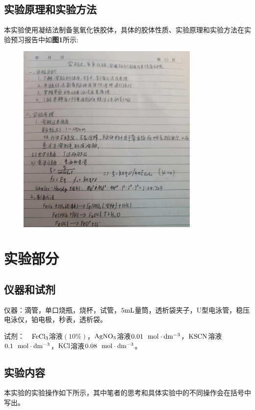 \documentclass[12pt]{article}
\begin{document}
		\subsection{实验原理和实验方法}
		本实验使用凝结法制备氢氧化铁胶体，具体的胶体性质、实验原理和实验方法在实验预习报告中如\textbf{图1}所示: \par
		\begin{figure}[h]
			\centering
			\includegraphics[width=0.8\textwidth]{1.png}
		\end{figure}
			
	     
    \section{实验部分}
    	\subsection{仪器和试剂}
    		仪器：滴管，单口烧瓶，烧杯，试管，$\rm 5 mL$量筒，透析袋夹子，U型电泳管，稳压电泳仪，铂电极，秒表，透析袋。\par
			试剂：\ \  $\rm FeCl_{3}$溶液$(10\%)$，$\rm AgNO_{3}$溶液$0.01\ \ {\rm mol\cdot dm^{-3}}$，$\rm KSCN$溶液$0.1\ \ {\rm mol\cdot dm^{-3}}$，$\rm KCl$溶液$0.08\ \ {\rm mol\cdot dm^{-3}}$。\par 
    			
    	 \subsection{实验内容}
		 本实验的实验操作如下所示，其中笔者的思考和具体实验中的不同操作会在括号中写出。\par
\end{document}
